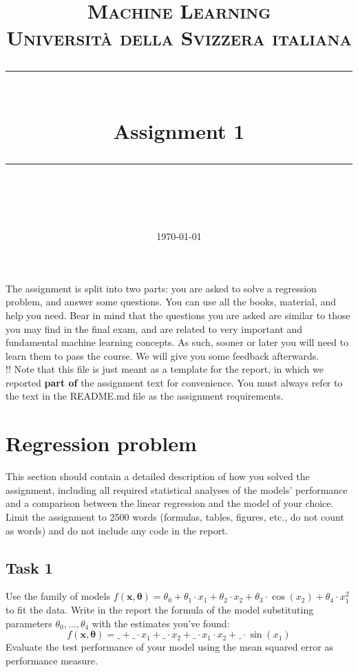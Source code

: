 \documentclass[11pt]{scrartcl}
\title{	
	\normalfont\normalsize
	\textsc{Machine Learning\\%
	Universit\`a della Svizzera italiana}\\
	\vspace{25pt}
	\rule{\linewidth}{0.5pt}\\
	\vspace{20pt}
	{\huge Assignment 1}\\
	\vspace{12pt}
	\rule{\linewidth}{1pt}\\
	\vspace{12pt}
}
\author{\LARGE \thestudent}
\date{\normalsize\today}
\begin{document}
\maketitle

The assignment is split into two parts: you are asked to solve a regression problem, and answer some questions. 
You can use all the books, material, and help you need. 
Bear in mind that the questions you are asked are similar to those you may find in the final exam, and are related to very important and fundamental machine learning concepts. 
As such, sooner or later you will need to learn them to pass the course. 
We will give you some feedback afterwards.\\

\noindent !! Note that this file is just meant as a template for the report, in which we reported \textbf{part of} the assignment text for convenience. You must always refer to the text in the README.md file as the assignment requirements.


\section{Regression problem}

This section should contain a detailed description of how you solved the assignment, including all required statistical analyses of the models' performance and a comparison between the linear regression and the model of your choice. Limit the assignment to 2500 words (formulas, tables, figures, etc., do not count as words) and do not include any code in the report.

\subsection{Task 1}
Use the family of models $f(\mathbf{x}, \boldsymbol{\theta}) = \theta_0 + \theta_1 \cdot x_1 + \theta_2 \cdot x_2 + \theta_3 \cdot \cos(x_2) + \theta_4 \cdot x_1^{2}$ to fit the data. Write in the report the formula of the model substituting parameters $\theta_0, \ldots, \theta_4$ with the estimates you've found:
$$f(\mathbf{x}, \boldsymbol{\theta}) = \_ + \_ \cdot x_1 + \_ \cdot x_2 + \_ \cdot x_1 \cdot x_2 + \_ \cdot \sin(x_1)$$
Evaluate the test performance of your model using the mean squared error as performance measure.
\end{document}
